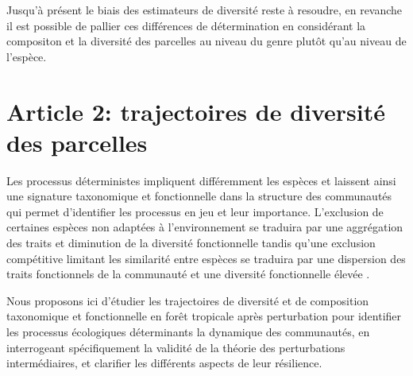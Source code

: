 \documentclass[
  11pt,
  french,
  A4paper,
  extrafontsizes,onecolumn,openright
  ]{memoir}
\begin{document}
Jusqu'à présent le biais des estimateurs de diversité reste à resoudre,
en revanche il est possible de pallier ces différences de détermination
en considérant la compositon et la diversité des parcelles au niveau du
genre plutôt qu'au niveau de l'espèce.

\chapter{Article 2: trajectoires de diversité des
parcelles}\label{article-2-trajectoires-de-diversite-des-parcelles}

Les processus déterministes impliquent différemment les espèces et
laissent ainsi une signature taxonomique et fonctionnelle dans la
structure des communautés \autocite{Funk2017} qui permet d'identifier
les processus en jeu et leur importance. L'exclusion de certaines
espèces non adaptées à l'environnement se traduira par une aggrégation
des traits et diminution de la diversité fonctionnelle tandis qu'une
exclusion compétitive limitant les similarité entre espèces se traduira
par une dispersion des traits fonctionnels de la communauté et une
diversité fonctionnelle élevée \autocites{McGill2006}{Kunstler2012}.

Nous proposons ici d'étudier les trajectoires de diversité et de
composition taxonomique et fonctionnelle en forêt tropicale après
perturbation pour identifier les processus écologiques déterminants la
dynamique des communautés, en interrogeant spécifiquement la validité de
la théorie des perturbations intermédiaires, et clarifier les différents
aspects de leur résilience.
\end{document}
